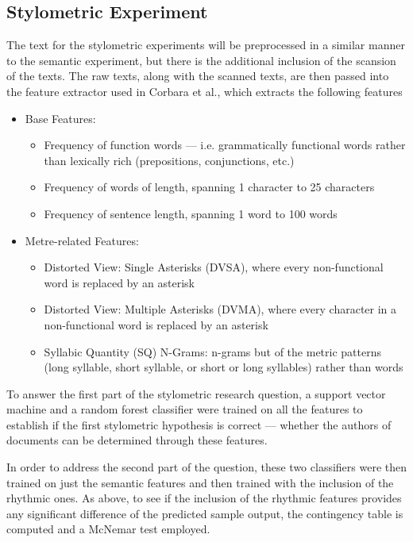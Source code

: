 \documentclass{csfourzero}
\begin{document}
\subsection{Stylometric Experiment}
The text for the stylometric experiments will be preprocessed in a similar manner to the semantic experiment, but there is the additional inclusion of the scansion of the texts. The raw texts, along with the scanned texts, are then passed into the feature extractor used in Corbara et al.\cite{SyllabicQuantity}, which extracts the following features
\begin{itemize}
    \item Base Features:
    \begin{itemize}
        \item Frequency of function words --- i.e. grammatically functional words rather than lexically rich (prepositions, conjunctions, etc.)
        \item Frequency of words of length, spanning 1 character to 25 characters
        \item Frequency of sentence length, spanning 1 word to 100 words
    \end{itemize}
    \item Metre-related Features:
    \begin{itemize}
        \item Distorted View: Single Asterisks (DVSA), where every non-functional word is replaced by an asterisk
        \item Distorted View: Multiple Asterisks (DVMA), where every character in a non-functional word is replaced by an asterisk
        \item Syllabic Quantity (SQ) N-Grams: n-grams but of the metric patterns (long syllable, short syllable, or short or long syllables) rather than words
    \end{itemize}
\end{itemize}

 To answer the first part of the stylometric research question, a support vector machine and a random forest classifier were trained on all the features to establish if the first stylometric hypothesis is correct --- whether the authors of documents can be determined through these features. 
 
 In order to address the second part of the question, these two classifiers were then trained on just the semantic features and then trained with the inclusion of the rhythmic ones. As above, to see if the inclusion of the rhythmic features provides any significant difference of the predicted sample output, the contingency table is computed and a McNemar test employed. 
 
\end{document}
